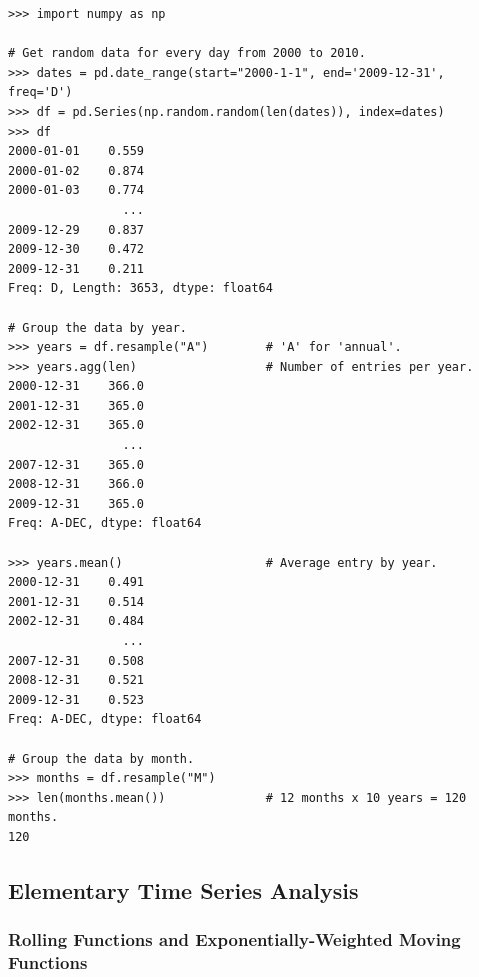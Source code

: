 \begin{lstlisting}
>>> import numpy as np

# Get random data for every day from 2000 to 2010.
>>> dates = pd.date_range(start="2000-1-1", end='2009-12-31', freq='D')
>>> df = pd.Series(np.random.random(len(dates)), index=dates)
>>> df
2000-01-01    0.559
2000-01-02    0.874
2000-01-03    0.774
                ...
2009-12-29    0.837
2009-12-30    0.472
2009-12-31    0.211
Freq: D, Length: 3653, dtype: float64

# Group the data by year.
>>> years = df.resample("A")        # 'A' for 'annual'.
>>> years.agg(len)                  # Number of entries per year.
2000-12-31    366.0
2001-12-31    365.0
2002-12-31    365.0
                ...
2007-12-31    365.0
2008-12-31    366.0
2009-12-31    365.0
Freq: A-DEC, dtype: float64

>>> years.mean()                    # Average entry by year.
2000-12-31    0.491
2001-12-31    0.514
2002-12-31    0.484
                ...
2007-12-31    0.508
2008-12-31    0.521
2009-12-31    0.523
Freq: A-DEC, dtype: float64

# Group the data by month.
>>> months = df.resample("M")
>>> len(months.mean())              # 12 months x 10 years = 120 months.
120
\end{lstlisting}

\subsection*{Elementary Time Series Analysis} %

\subsubsection*{Rolling Functions and Exponentially-Weighted Moving Functions}

